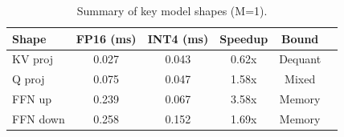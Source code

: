 
\vspace{0.2cm}
\begin{table}[h]
    \centering
    \label{tab:shapes}
    \begin{tabular}{lccccl}
      \toprule
      Shape & FP16 (ms) & INT4 (ms) & Speedup & Bound \\
      \midrule
      KV proj   & 0.027 & 0.043 & 0.62x & Dequant \\
      Q proj    & 0.075 & 0.047 & 1.58x & Mixed \\
      FFN up    & 0.239 & 0.067 & 3.58x & Memory \\
      FFN down  & 0.258 & 0.152 & 1.69x & Memory \\
      \bottomrule
        \end{tabular}
    \caption{Summary of key model shapes (M=1).}
\end{table}
\vspace{-0.55cm}
